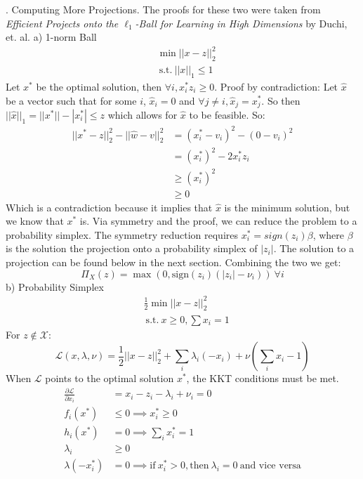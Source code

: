 \documentclass{article}
\begin{document}
. Computing More Projections. The proofs for these two were taken from \textit{Efficient Projects onto the $\ell_1$-Ball for Learning in High Dimensions} by Duchi, et. al.
\newline
a) 1-norm Ball
\begin{align*}
	&\min{||x - z||^2_2} \\
	& \ \text{s.t.} \ ||x||_1 \leq 1
\end{align*}
Let $x^*$ be the optimal solution, then $\forall i, x^*_iz_i \geq 0$. Proof by contradiction:
Let $\hat{x}$ be a vector such that for some $i$, $\hat{x}_i = 0$ and $\forall j \neq i, \hat{x}_j = x^*_j$. So then $||\hat{x}||_1 = ||x^*|| - |x^*_i| \leq z$ which allows for $\hat{x}$ to be feasible. So:
\begin{align*}
	||x^*- z||^2_2 - ||\hat{w} - v||^2_2 &= (x^*_i - v_i)^2 - (0 - v_i)^2 \\
	&= (x^{*}_i)^{2} - 2x^*_iz_i \\
	&\geq (x^{*}_i)^{2} \\
	& \geq 0
\end{align*}
Which is a contradiction because it implies that $\hat{x}$ is the minimum solution, but we know that $x^*$ is. Via symmetry and the proof, we can reduce the problem to a probability simplex. The symmetry reduction requires $x^*_i = sign(z_i)\beta$, where $\beta$ is the solution the projection onto a probability simplex of $|z_i|$. The solution to a projection can be found below in the next section. Combining the two we get:
\begin{equation*}
	\Pi_X(z) = \max(0, \text{sign}(z_i)(|z_i| - \nu_i)) \ \forall i
\end{equation*}
b) Probability Simplex \newline
\begin{align*}
	&\frac{1}{2}\min{||x - z||^2_2} \\
	& \ \text{s.t.} \ x \geq 0, \sum{x_i} = 1
\end{align*}
For $z \not\in \mathcal{X}$:
\begin{equation*}
	\mathcal{L}(x, \lambda, \nu) = \frac{1}{2}{||x - z||^2_2} + \sum_i{\lambda_i(-x_i)} + \nu(\sum_i{x_i} - 1)
\end{equation*}
When $\mathcal{L}$ points to the optimal solution $x^*$, the KKT conditions must be met. 
\begin{align*}
	\frac{\partial\mathcal{L}}{\partial x_i} &= x_i - z_i - \lambda_i + \nu_i = 0 \\
	f_i(x^*) &\leq 0 \implies x^*_i \geq 0 \\
	h_i(x^*) &= 0 \implies \sum_i{x^*_i} = 1 \\
	\lambda_i &\geq 0 \\
	\lambda(-x^*_i) &= 0  \implies \text{if}  \ x^*_i > 0, \text{then} \ \lambda_i = 0 \ \text{and vice versa}
\end{align*}
\end{document}
